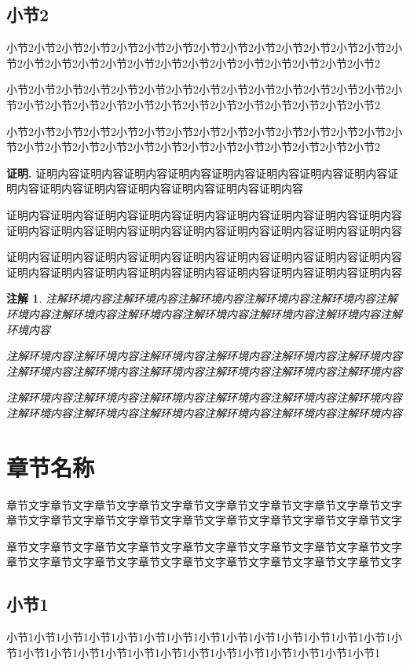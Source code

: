 \documentclass[a4paper, 12pt, oneside]{article}
\theoremstyle{cn_theorem}
\newtheorem{remark}{注解}[section]  %
\begin{document}
\subsection{小节2}
小节2小节2小节2小节2小节2小节2小节2小节2小节2小节2小节2小节2小节2小节2小节2小节2小节2小节2小节2小节2小节2小节2小节2小节2小节2小节2小节2小节2

小节2小节2小节2小节2小节2小节2小节2小节2小节2小节2小节2小节2小节2小节2小节2小节2小节2小节2小节2小节2小节2小节2小节2小节2小节2小节2小节2小节2

小节2小节2小节2小节2小节2小节2小节2小节2小节2小节2小节2小节2小节2小节2小节2小节2小节2小节2小节2小节2小节2小节2小节2小节2小节2小节2小节2小节2

\textbf{\heiti 证明.} 证明内容证明内容证明内容证明内容证明内容证明内容证明内容证明内容证明内容证明内容证明内容证明内容证明内容证明内容证明内容

证明内容证明内容证明内容证明内容证明内容证明内容证明内容证明内容证明内容证明内容证明内容证明内容证明内容证明内容证明内容证明内容证明内容证明内容

证明内容证明内容证明内容证明内容证明内容证明内容证明内容证明内容证明内容证明内容证明内容证明内容证明内容证明内容证明内容证明内容证明内容证明内容


\begin{remark}
注解环境内容注解环境内容注解环境内容注解环境内容注解环境内容注解环境内容注解环境内容注解环境内容注解环境内容注解环境内容注解环境内容注解环境内容

注解环境内容注解环境内容注解环境内容注解环境内容注解环境内容注解环境内容注解环境内容注解环境内容注解环境内容注解环境内容注解环境内容注解环境内容

注解环境内容注解环境内容注解环境内容注解环境内容注解环境内容注解环境内容注解环境内容注解环境内容注解环境内容注解环境内容注解环境内容注解环境内容
\end{remark}

\section{章节名称}

章节文字章节文字章节文字章节文字章节文字章节文字章节文字章节文字章节文字章节文字章节文字章节文字章节文字章节文字章节文字章节文字章节文字章节文字

章节文字章节文字章节文字章节文字章节文字章节文字章节文字章节文字章节文字章节文字章节文字章节文字章节文字章节文字章节文字章节文字章节文字章节文字

\subsection{小节1}
小节1小节1小节1小节1小节1小节1小节1小节1小节1小节1小节1小节1小节1小节1小节1小节1小节1小节1小节1小节1小节1小节1小节1小节1小节1小节1小节1小节1
\end{document}
